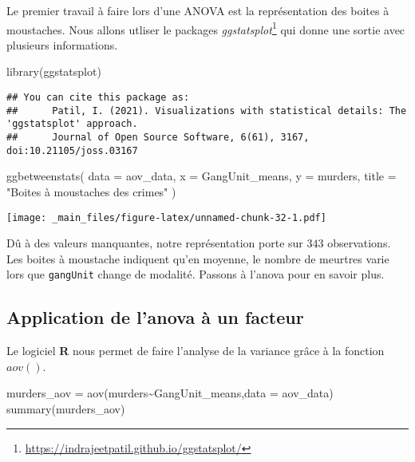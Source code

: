 \documentclass[
]{book}
\newenvironment{Shaded}{\begin{snugshade}}{\end{snugshade}}
\newcommand{\AttributeTok}[1]{\textcolor[rgb]{0.77,0.63,0.00}{#1}}
\newcommand{\FunctionTok}[1]{\textcolor[rgb]{0.00,0.00,0.00}{#1}}
\newcommand{\NormalTok}[1]{#1}
\newcommand{\OtherTok}[1]{\textcolor[rgb]{0.56,0.35,0.01}{#1}}
\newcommand{\SpecialCharTok}[1]{\textcolor[rgb]{0.00,0.00,0.00}{#1}}
\newcommand{\StringTok}[1]{\textcolor[rgb]{0.31,0.60,0.02}{#1}}
\begin{document}
Le premier travail à faire lors d'une ANOVA est la représentation des boites à moustaches. Nous allons utliser le packages \emph{ggstatsplot}\footnote{\url{https://indrajeetpatil.github.io/ggstatsplot/}} qui donne une sortie avec plusieurs informations.

\begin{Shaded}
\begin{Highlighting}[]
\FunctionTok{library}\NormalTok{(ggstatsplot)}
\end{Highlighting}
\end{Shaded}

\begin{verbatim}
## You can cite this package as:
##      Patil, I. (2021). Visualizations with statistical details: The 'ggstatsplot' approach.
##      Journal of Open Source Software, 6(61), 3167, doi:10.21105/joss.03167
\end{verbatim}

\begin{Shaded}
\begin{Highlighting}[]
\FunctionTok{ggbetweenstats}\NormalTok{(}
  \AttributeTok{data =}\NormalTok{ aov\_data,}
  \AttributeTok{x     =}\NormalTok{ GangUnit\_means,}
  \AttributeTok{y     =}\NormalTok{ murders,}
  \AttributeTok{title =} \StringTok{"Boites à moustaches des crimes"}
\NormalTok{)}
\end{Highlighting}
\end{Shaded}

\texttt{[image: \_main\_files/figure-latex/unnamed-chunk-32-1.pdf]}

Dû à des valeurs manquantes, notre représentation porte sur \(343\) observations. Les boites à moustache indiquent qu'en moyenne, le nombre de meurtres varie lors que \texttt{gangUnit} change de modalité. Passons à l'anova pour en savoir plus.

\hypertarget{application-de-lanova-uxe0-un-facteur}{%
\subsection*{Application de l'anova à un facteur}\label{application-de-lanova-uxe0-un-facteur}}

Le logiciel \textbf{R} nous permet de faire l'analyse de la variance grâce à la fonction \(aov()\).

\begin{Shaded}
\begin{Highlighting}[]
\NormalTok{murders\_aov }\OtherTok{=} \FunctionTok{aov}\NormalTok{(murders}\SpecialCharTok{\textasciitilde{}}\NormalTok{GangUnit\_means,}\AttributeTok{data =}\NormalTok{ aov\_data)}
\FunctionTok{summary}\NormalTok{(murders\_aov)}
\end{Highlighting}
\end{Shaded}
\end{document}

